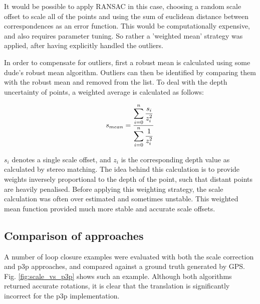 It would be possible to apply RANSAC in this case, choosing a random scale offset to scale all of the points and using the sum of euclidean distance between correspondences as an error function.  This would be computationally expensive, and also requires parameter tuning.  So rather a 'weighted mean' strategy was applied, after having explicitly handled the outliers.

In order to compensate for outliers, first a robust mean is calculated using some dude's robust mean algorithm.  Outliers can then be identified by comparing them with the robust mean and removed from the list. To deal with the depth uncertainty of points, a weighted average is calculated as follows:

\begin{equation}
\centering
s_{mean} = \dfrac{\displaystyle\sum\limits_{i=0}^n{\dfrac{s_i}{z_i^2}}}
{\displaystyle\sum\limits_{i=0}^n{\dfrac{1}{z_i^2}}}
\end{equation}

$s_i$ denotes a single scale offset, and $z_i$ is the corresponding depth value as calculated by stereo matching.  The idea behind this calculation is to provide weights inversely proportional to the depth of the point, such that distant points are heavily penalised.  Before applying this weighting strategy, the scale calculation was often over estimated and sometimes unstable.  This weighted mean function provided much more stable and accurate scale offsets.



\subsection{Comparison of approaches}

A number of loop closure examples were evaluated with both the scale correction and p3p approaches, and compared against a ground truth generated by GPS.  Fig. \ref{fig:scale_vs_p3p} shows such an example.  Although both algorithms returned accurate rotations, it is clear that the translation is significantly incorrect for the p3p implementation.

